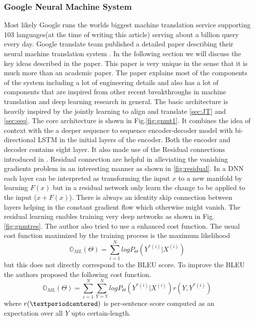 \documentclass[conference]{IEEEtran}
\begin{document}
\subsubsection{Google Neural Machine System}
Most likely Google runs the worlds biggest  \cite{WinNT} machine translation service supporting 103 languages(at the time of writing this article) serving about a 
billion query every day. Google translate team published a detailed paper describing their neural machine translation system \cite{wu2016google}. In the following section we will discuss the key ideas described in the paper. This paper is very unique in the sense that it is much more than an academic paper. The paper explains most of the components of the system including a lot of engineering details and also has a lot of components that are inspired from other recent breakthroughs in machine translation and deep learning research in general. The basic architecture is heavily inspired by the jointly learning to align and translate \ref{sec:JT}  and \ref{sec:seq}. The core architecture is shown in Fig.\ref{fig:gnmt1}. It combines the idea of context with the a deeper sequence to sequence encoder-decoder model with bi-directional LSTM in the initial layers of the encoder. Both the encoder and decoder contains eight layer. It also made use of the Residual connections introduced in \cite{he2016deep}. Residual connection are helpful in alleviating the vanishing gradients problem in an interesting manner as shown in \ref{fig:residual}. In a DNN each layer can be interpreted as transforming the input $x$ to a new manifold by learning $F(x)$ but in a residual network only learn the change to be applied to the input ($x + F(x)$). There is always an identity skip connection between layers helping in the constant gradient flow which otherwise might vanish. The residual learning enables training very deep networks as shown in Fig.\ref{fig:gnmtres}.
The author also tried to use a enhanced cost function. The usual cost function maximized by the training process is the maximum likelihood $$\mathbb{O}_{ML}(\Theta) = \sum_{i=1}^N log P_\Theta(Y^{*(i)} | X^{(i)}) $$ but this does not directly correspond to the BLEU score. To improve the BLEU the authors proposed the following cost function. $$ \mathbb{O}_{ML}(\Theta) = \sum_{i=1}^N \sum_{Y=\mathbb{Y}}^N log P_\Theta(Y^{*(i)} | X^{(i)}) r(Y, Y^{*(i)} ) $$
 where $r(\textperiodcentered)$ is per-sentence score computed as an expectation over all $Y$ upto certain-length.











\end{document}
